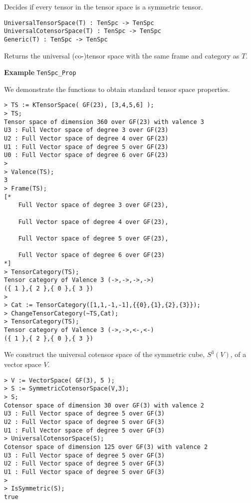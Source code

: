 Decides if every tensor in the tensor space is a symmetric tensor.

\color{blue}
{\small \begin{verbatim}
UniversalTensorSpace(T) : TenSpc -> TenSpc
UniversalCotensorSpace(T) : TenSpc -> TenSpc
Generic(T) : TenSpc -> TenSpc
\end{verbatim} }
\color{black}

Returns the universal (co-)tensor space with the same frame and category as $T$.

\begin{framed}{\bf Example} {\tt TenSpc\_Prop}\\
{\small We demonstrate the functions to obtain standard tensor space properties.
\begin{lstlisting}[frame=single,basicstyle=\ttfamily\color{black!30!
teal},backgroundcolor=\color{white!70!gray}]
> TS := KTensorSpace( GF(23), [3,4,5,6] );
> TS;
Tensor space of dimension 360 over GF(23) with valence 3
U3 : Full Vector space of degree 3 over GF(23)
U2 : Full Vector space of degree 4 over GF(23)
U1 : Full Vector space of degree 5 over GF(23)
U0 : Full Vector space of degree 6 over GF(23)
> 
> Valence(TS);
3
> Frame(TS);
[*
    Full Vector space of degree 3 over GF(23),

    Full Vector space of degree 4 over GF(23),

    Full Vector space of degree 5 over GF(23),

    Full Vector space of degree 6 over GF(23)
*]
> TensorCategory(TS);
Tensor category of Valence 3 (->,->,->,->) 
({ 1 },{ 2 },{ 0 },{ 3 })
> 
> Cat := TensorCategory([1,1,-1,-1],{{0},{1},{2},{3}});
> ChangeTensorCategory(~TS,Cat);
> TensorCategory(TS);
Tensor category of Valence 3 (->,->,<-,<-) 
({ 1 },{ 2 },{ 0 },{ 3 })
\end{lstlisting}
We construct the universal cotensor space of the symmetric cube, $S^3(V)$, of a vector space $V$.
\begin{lstlisting}[frame=single,basicstyle=\ttfamily\color{black!30!
teal},backgroundcolor=\color{white!70!gray}]
> V := VectorSpace( GF(3), 5 );
> S := SymmetricCotensorSpace(V,3);
> S;
Cotensor space of dimension 30 over GF(3) with valence 2
U3 : Full Vector space of degree 5 over GF(3)
U2 : Full Vector space of degree 5 over GF(3)
U1 : Full Vector space of degree 5 over GF(3)
> UniversalCotensorSpace(S);
Cotensor space of dimension 125 over GF(3) with valence 2
U3 : Full Vector space of degree 5 over GF(3)
U2 : Full Vector space of degree 5 over GF(3)
U1 : Full Vector space of degree 5 over GF(3)
> 
> IsSymmetric(S);
true
\end{lstlisting}
}
\end{framed}

